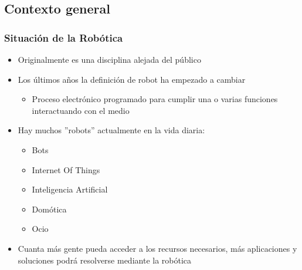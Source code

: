 \documentclass{beamer}
\begin{document}
\subsection{Contexto general}
\begin{frame}
\frametitle{Situación de la Robótica}

\begin{itemize}

	\item {} Originalmente es una disciplina alejada del público
	\item {} Los últimos años la definición de robot ha empezado a cambiar 
		\begin{itemize}
			\item {} Proceso electrónico programado para cumplir una o varias funciones interactuando con el medio
		\end{itemize}
	\item {} Hay muchos ''robots'' actualmente en la vida diaria:
		\begin{itemize}
			\item Bots
			\item Internet Of Things
			\item Inteligencia Artificial
			\item Domótica
			\item Ocio
		\end{itemize}
	\item {} Cuanta más gente pueda acceder a los recursos necesarios, más aplicaciones y soluciones podrá resolverse mediante la robótica
	
	
\end{itemize}

\end{frame}
\end{document}
